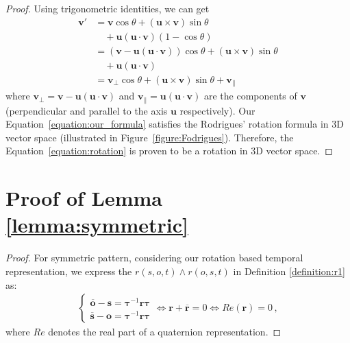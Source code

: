 \documentclass[11pt]{article}
\newcommand{\vect}[1]{\mathbf{#1}\xspace}
\newcommand{\vects}{\vect{s}\xspace}
\newcommand{\vectr}{\vect{r}\xspace}
\newcommand{\vecto}{\vect{o}\xspace}
\begin{document}
\begin{proof}
Using trigonometric identities, we can get
\begin{align}\label{equation:our_formula}
    \vect{v'}
    &=\vect{v} \cos \theta  + (\vect{u} \times \vect{v}) \sin \theta \nonumber\\
    & \quad + \vect{u} (\vect{u} \cdot \vect{v}) (1 - \cos \theta) \nonumber\\
    &=(\vect{v} - \vect{u} (\vect{u} \cdot \vect{v}))\cos \theta  + (\vect{u} \times \vect{v}) \sin \theta \nonumber\\
    & \quad + \vect{u} (\vect{u} \cdot \vect{v}) \nonumber\\
    &=\vect{{v}_{\perp}} \cos \theta  + (\vect{u} \times \vect{v}) \sin \theta +
    \vect{{v}_{\parallel}}
\end{align}
where $\vect{{v}_{\perp}} = \vect{v} - \vect{u} (\vect{u} \cdot \vect{v})$ and $\vect{{v}_{\parallel}} = \vect{u} (\vect{u} \cdot \vect{v})$ are the components of $\vect{v}$ (perpendicular and parallel to the axis $\vect{u}$ respectively).
Our Equation~\ref{equation:our_formula} satisfies the Rodrigues' rotation formula \cite{rodrigues1840lois} in 3D vector space (illustrated in Figure~\ref{figure:Fodrigues}).
Therefore, the Equation~\ref{equation:rotation} is proven to be a rotation in 3D vector space.
\end{proof}

\section{Proof of Lemma \ref{lemma:symmetric}}
\label{app:proof_symmetric}
\begin{proof}
For symmetric pattern, considering our rotation based temporal representation, we express the $ r(s,o,t) \land r(o,s,t)$ in Definition \ref{definition:r1} as:
\begin{equation}
\begin{aligned}
\left\{  
     \begin{aligned}
     \overline{\vecto} - \vects  = \pmb{\tau}^{-1} \vectr \pmb{\tau} \\
    \overline{\vects} - \vecto  = \pmb{\tau}^{-1} \vectr \pmb{\tau}
    \end{aligned}
\right.
\Leftrightarrow 
\vectr + \overline{\vectr}=0
\Leftrightarrow 
Re(\vectr)=0\,,
\end{aligned}
\end{equation}
where $Re$ denotes the real part of a quaternion representation.
\end{proof}
\end{document}
